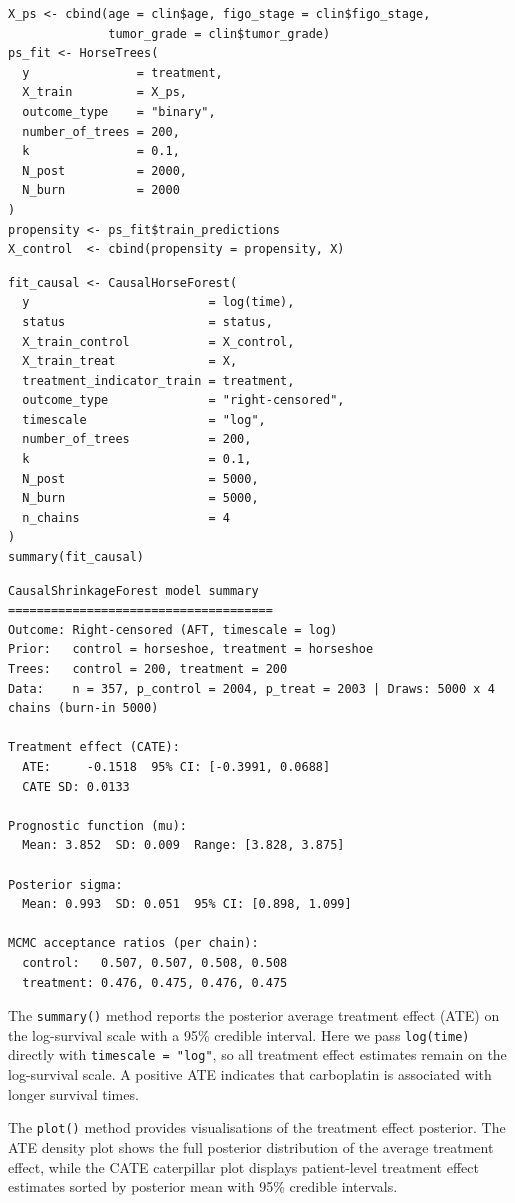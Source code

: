 \begin{verbatim}
X_ps <- cbind(age = clin$age, figo_stage = clin$figo_stage,
              tumor_grade = clin$tumor_grade)
ps_fit <- HorseTrees(
  y               = treatment,
  X_train         = X_ps,
  outcome_type    = "binary",
  number_of_trees = 200,
  k               = 0.1,
  N_post          = 2000,
  N_burn          = 2000
)
propensity <- ps_fit$train_predictions
X_control  <- cbind(propensity = propensity, X)
\end{verbatim}

\begin{verbatim}
fit_causal <- CausalHorseForest(
  y                         = log(time),
  status                    = status,
  X_train_control           = X_control,
  X_train_treat             = X,
  treatment_indicator_train = treatment,
  outcome_type              = "right-censored",
  timescale                 = "log",
  number_of_trees           = 200,
  k                         = 0.1,
  N_post                    = 5000,
  N_burn                    = 5000,
  n_chains                  = 4
)
summary(fit_causal)
\end{verbatim}

\begin{verbatim}
CausalShrinkageForest model summary
=====================================
Outcome: Right-censored (AFT, timescale = log)
Prior:   control = horseshoe, treatment = horseshoe
Trees:   control = 200, treatment = 200
Data:    n = 357, p_control = 2004, p_treat = 2003 | Draws: 5000 x 4 chains (burn-in 5000)

Treatment effect (CATE):
  ATE:     -0.1518  95% CI: [-0.3991, 0.0688]
  CATE SD: 0.0133

Prognostic function (mu):
  Mean: 3.852  SD: 0.009  Range: [3.828, 3.875]

Posterior sigma:
  Mean: 0.993  SD: 0.051  95% CI: [0.898, 1.099]

MCMC acceptance ratios (per chain):
  control:   0.507, 0.507, 0.508, 0.508
  treatment: 0.476, 0.475, 0.476, 0.475
\end{verbatim}

The \texttt{summary()} method reports the posterior average treatment effect (ATE) on the log-survival scale with a 95\% credible interval. Here we pass \texttt{log(time)} directly with \texttt{timescale\ =\ "log"}, so all treatment effect estimates remain on the log-survival scale. A positive ATE indicates that carboplatin is associated with longer survival times.

The \texttt{plot()} method provides visualisations of the treatment effect posterior. The ATE density plot shows the full posterior distribution of the average treatment effect, while the CATE caterpillar plot displays patient-level treatment effect estimates sorted by posterior mean with 95\% credible intervals.

